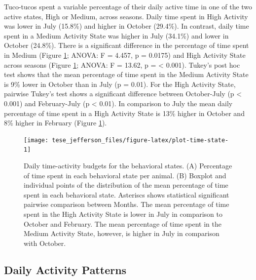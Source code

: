 \documentclass[msc,numbers,hidelinks]{coppe}
\begin{document}
  Tuco-tucos spent a variable percentage of their daily active time in one of the two active states, High or Medium, across seasons. Daily time spent in High Activity was lower in July (15.8\%) and higher in October (29.4\%). In contrast, daily time spent in a Medium Activity State was higher in July (34.1\%) and lower in October (24.8\%). There is a significant difference in the percentage of time spent in Medium (Figure \ref{fig:plot-time-state}; ANOVA: F = 4.457, p = 0.0175) and High Activity State across seasons (Figure \ref{fig:plot-time-state}; ANOVA: F = 13.62, p = \textless{} 0.001). Tukey's post hoc test shows that the mean percentage of time spent in the Medium Activity State is 9\% lower in October than in July (p = 0.01). For the High Activity State, pairwise Tukey's test shows a significant difference between October-July (p \textless{} 0.001) and February-July (p \textless{} 0.01). In comparison to July the mean daily percentage of time spent in a High Activity State is 13\% higher in October and 8\% higher in February (Figure \ref{fig:plot-time-state}).
  \begin{figure}

  {\centering \texttt{[image: tese\_jefferson\_files/figure-latex/plot-time-state-1]} 

  }

  \caption{Daily time-activity budgets for the behavioral states. (A) Percentage of time spent in each behavioral state per animal. (B) Boxplot and individual points of the distribution of the mean percentage of time spent in each behavioral state. Asteriscs shows statistical significant pairwise comparison between Months. The mean percentage of time spent in the High Activity State is lower in July in comparison to October and February. The mean percentage of time spent in the Medium Activity State, however, is higher in July in comparison with October.}\label{fig:plot-time-state}
  \end{figure}
  \newpage

  \hypertarget{daily-activity-patterns}{%
  \subsection{Daily Activity Patterns}\label{daily-activity-patterns}}
\end{document}
